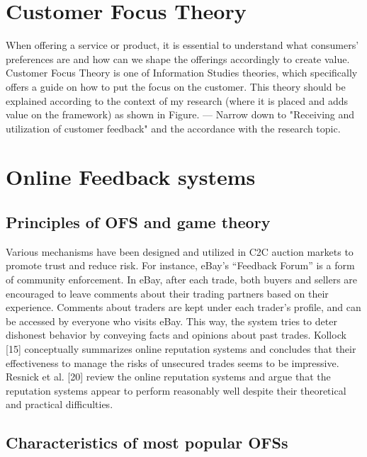 \documentclass[a4paper, 11pt]{article}
\begin{document}
\section{Customer Focus Theory}
\label{sec:CFTH}

When offering a service or product, it is essential to understand what consumers' preferences are and how can we shape the offerings accordingly to create value. Customer Focus Theory is one of Information Studies theories, which specifically offers a guide on how to put the focus on the customer. This theory should be explained according to the context of my research (where it is placed and adds value on the framework) as shown in Figure. 
--- Narrow down to "Receiving and utilization of customer feedback" and the accordance with the research topic.


\section{Online Feedback systems}


\subsection{Principles of OFS and game theory}

Various mechanisms have been designed and utilized
in C2C auction markets to promote trust and reduce risk.
For instance,
eBay's “Feedback Forum” is a form of community enforcement.
In eBay, after each trade, both buyers and
sellers are encouraged to leave comments about their
trading partners based on their experience. Comments
about traders are kept under each trader's profile, and can
be accessed by everyone who visits eBay. This way, the
system tries to deter dishonest behavior by conveying
facts and opinions about past trades. Kollock [15]
conceptually summarizes online reputation systems and
concludes that their effectiveness to manage the risks of
unsecured trades seems to be impressive. Resnick et al.
[20] review the online reputation systems and argue that
the reputation systems appear to perform reasonably well
despite their theoretical and practical difficulties. \cite{yang2007effects}


\subsection{Characteristics of most popular OFSs}
\label{subsec:popularOFS}
\end{document}
